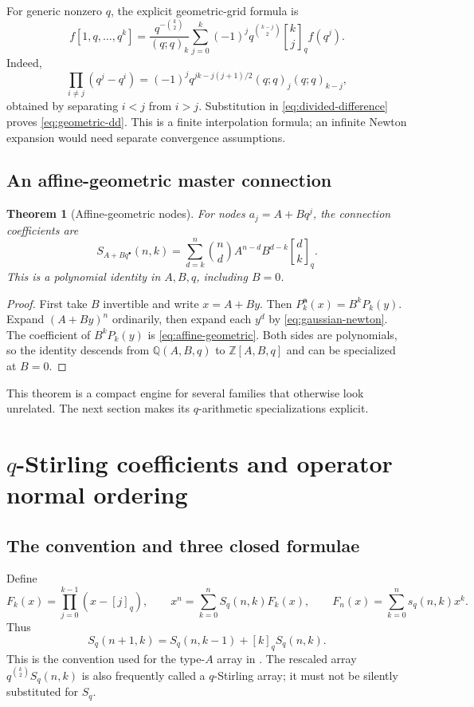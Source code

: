 \documentclass[11pt,a4paper]{article}
\numberwithin{equation}{section}
\newtheorem{theorem}{Theorem}[section]
\theoremstyle{definition}
\theoremstyle{remark}
\newcommand{\Z}{\mathbb Z}
\newcommand{\Q}{\mathbb Q}
\newcommand{\G}[2]{\genfrac{[}{]}{0pt}{}{#1}{#2}_{q}}
\newcommand{\qnum}[1]{[#1]_q}
\begin{document}
For generic nonzero $q$, the explicit geometric-grid formula is
\begin{equation}
 f[1,q,\ldots,q^k]
 =\frac{q^{-\binom k2}}{(q;q)_k}
   \sum_{j=0}^k(-1)^jq^{\binom{k-j}2}\G kj f(q^j).
 \label{eq:geometric-dd}
\end{equation}
Indeed,
\begin{equation}
 \prod_{i\ne j}(q^j-q^i)
 =(-1)^jq^{jk-j(j+1)/2}(q;q)_j(q;q)_{k-j},
 \label{eq:geometric-denominator}
\end{equation}
obtained by separating $i<j$ from $i>j$. Substitution in
\cref{eq:divided-difference} proves \cref{eq:geometric-dd}.
This is a finite interpolation formula; an infinite Newton expansion
would need separate convergence assumptions.

\subsection{An affine-geometric master connection}
\begin{theorem}[Affine-geometric nodes]
\label{thm:affine}
For nodes $a_j=A+Bq^j$, the connection coefficients are
\begin{equation}
 S_{A+Bq^\bullet}(n,k)
 =\sum_{d=k}^n\binom nd A^{n-d}B^{d-k}\G dk.
 \label{eq:affine-geometric}
\end{equation}
This is a polynomial identity in $A,B,q$, including $B=0$.
\end{theorem}
\begin{proof}
First take $B$ invertible and write $x=A+By$. Then
$P_k^{\boldsymbol a}(x)=B^kP_k(y)$. Expand $(A+By)^n$ ordinarily,
then expand each $y^d$ by \cref{eq:gaussian-newton}. The coefficient of
$B^kP_k(y)$ is \cref{eq:affine-geometric}. Both sides are polynomials,
so the identity descends from $\Q(A,B,q)$ to $\Z[A,B,q]$ and can be
specialized at $B=0$.
\end{proof}
This theorem is a compact engine for several families that otherwise
look unrelated. The next section makes its $q$-arithmetic specializations
explicit.

\section{\texorpdfstring{$q$}{q}-Stirling coefficients and operator normal ordering}
\label{sec:stirling}
\subsection{The convention and three closed formulae}
Define
\begin{equation}
 F_k(x)=\prod_{j=0}^{k-1}(x-\qnum j),\qquad
 x^n=\sum_{k=0}^nS_q(n,k)F_k(x),\qquad
 F_n(x)=\sum_{k=0}^ns_q(n,k)x^k.
 \label{eq:qstirling-def}
\end{equation}
Thus
\begin{equation}
 S_q(n+1,k)=S_q(n,k-1)+\qnum k S_q(n,k).
 \label{eq:qstirling-rec}
\end{equation}
This is the convention used for the type-$A$ array in \cite{dingzeng}.
The rescaled array $q^{\binom k2}S_q(n,k)$ is also frequently called a
$q$-Stirling array; it must not be silently substituted for $S_q$.
\end{document}
